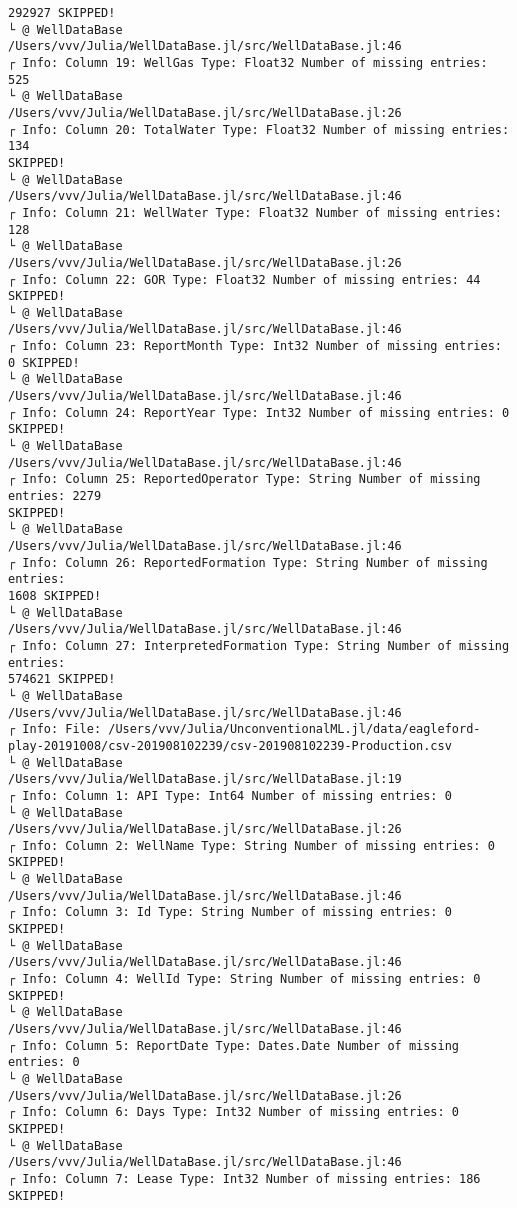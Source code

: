 \documentclass[11pt]{article}
\begin{document}
\begin{Verbatim}[commandchars=\\\{\}]
292927 SKIPPED!
└ @ WellDataBase /Users/vvv/Julia/WellDataBase.jl/src/WellDataBase.jl:46
┌ Info: Column 19: WellGas Type: Float32 Number of missing entries: 525
└ @ WellDataBase /Users/vvv/Julia/WellDataBase.jl/src/WellDataBase.jl:26
┌ Info: Column 20: TotalWater Type: Float32 Number of missing entries: 134
SKIPPED!
└ @ WellDataBase /Users/vvv/Julia/WellDataBase.jl/src/WellDataBase.jl:46
┌ Info: Column 21: WellWater Type: Float32 Number of missing entries: 128
└ @ WellDataBase /Users/vvv/Julia/WellDataBase.jl/src/WellDataBase.jl:26
┌ Info: Column 22: GOR Type: Float32 Number of missing entries: 44 SKIPPED!
└ @ WellDataBase /Users/vvv/Julia/WellDataBase.jl/src/WellDataBase.jl:46
┌ Info: Column 23: ReportMonth Type: Int32 Number of missing entries: 0 SKIPPED!
└ @ WellDataBase /Users/vvv/Julia/WellDataBase.jl/src/WellDataBase.jl:46
┌ Info: Column 24: ReportYear Type: Int32 Number of missing entries: 0 SKIPPED!
└ @ WellDataBase /Users/vvv/Julia/WellDataBase.jl/src/WellDataBase.jl:46
┌ Info: Column 25: ReportedOperator Type: String Number of missing entries: 2279
SKIPPED!
└ @ WellDataBase /Users/vvv/Julia/WellDataBase.jl/src/WellDataBase.jl:46
┌ Info: Column 26: ReportedFormation Type: String Number of missing entries:
1608 SKIPPED!
└ @ WellDataBase /Users/vvv/Julia/WellDataBase.jl/src/WellDataBase.jl:46
┌ Info: Column 27: InterpretedFormation Type: String Number of missing entries:
574621 SKIPPED!
└ @ WellDataBase /Users/vvv/Julia/WellDataBase.jl/src/WellDataBase.jl:46
┌ Info: File: /Users/vvv/Julia/UnconventionalML.jl/data/eagleford-
play-20191008/csv-201908102239/csv-201908102239-Production.csv
└ @ WellDataBase /Users/vvv/Julia/WellDataBase.jl/src/WellDataBase.jl:19
┌ Info: Column 1: API Type: Int64 Number of missing entries: 0
└ @ WellDataBase /Users/vvv/Julia/WellDataBase.jl/src/WellDataBase.jl:26
┌ Info: Column 2: WellName Type: String Number of missing entries: 0 SKIPPED!
└ @ WellDataBase /Users/vvv/Julia/WellDataBase.jl/src/WellDataBase.jl:46
┌ Info: Column 3: Id Type: String Number of missing entries: 0 SKIPPED!
└ @ WellDataBase /Users/vvv/Julia/WellDataBase.jl/src/WellDataBase.jl:46
┌ Info: Column 4: WellId Type: String Number of missing entries: 0 SKIPPED!
└ @ WellDataBase /Users/vvv/Julia/WellDataBase.jl/src/WellDataBase.jl:46
┌ Info: Column 5: ReportDate Type: Dates.Date Number of missing entries: 0
└ @ WellDataBase /Users/vvv/Julia/WellDataBase.jl/src/WellDataBase.jl:26
┌ Info: Column 6: Days Type: Int32 Number of missing entries: 0 SKIPPED!
└ @ WellDataBase /Users/vvv/Julia/WellDataBase.jl/src/WellDataBase.jl:46
┌ Info: Column 7: Lease Type: Int32 Number of missing entries: 186 SKIPPED!

\end{Verbatim}
\end{document}
